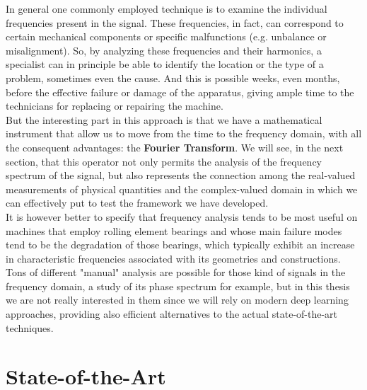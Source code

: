 \documentclass[../main.tex]{subfiles}
\begin{document}
In general one commonly employed technique is to examine the individual frequencies present in the signal. These frequencies, in fact, can correspond to certain mechanical components or specific malfunctions (e.g. unbalance or misalignment). So, by analyzing these frequencies and their harmonics, a specialist can in principle be able to identify the location or the type of a problem, sometimes even the cause. And this is possible weeks, even months, before the effective failure or damage of the apparatus, giving ample time to the technicians for replacing or repairing the machine. \\
But the interesting part in this approach is that we have a mathematical instrument that allow us to move from the time to the frequency domain, with all the consequent advantages: the \textbf{Fourier Transform}. We will see, in the next section, that this operator not only permits the analysis of the frequency spectrum of the signal, but also represents the connection among the real-valued measurements of physical quantities and the complex-valued domain in which we can effectively put to test the framework we have developed.\\
It is however better to specify that frequency analysis tends to be most useful on machines that employ rolling element bearings and whose main failure modes tend to be the degradation of those bearings, which typically exhibit an increase in characteristic frequencies associated with its geometries and constructions.\\
Tons of different "manual" analysis are possible for those kind of signals in the frequency domain, a study of its phase spectrum for example, but in this thesis we are not really interested in them since we will rely on modern deep learning approaches, providing also efficient alternatives to the actual state-of-the-art techniques.


\section{State-of-the-Art}
\end{document}
